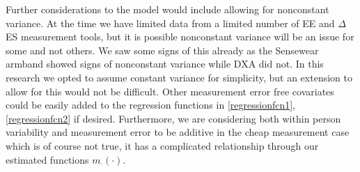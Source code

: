 \documentclass[11pt]{article}\usepackage[]{graphicx}\usepackage[]{color}
\begin{document}
Further considerations to the model would include allowing for nonconstant variance. At the time we have limited data from a limited number of EE and $\Delta$ES measurement tools, but it is possible nonconstant variance will be an issue for some and not others. We saw some signs of this already as the Sensewear armband showed signs of nonconstant variance while DXA did not. In this research we opted to assume constant variance for simplicity, but an extension to allow for this would not be difficult. Other measurement error free covariates could be easily added to the regression functions in \eqref{regressionfcn1},\eqref{regressionfcn2} if desired. 
Furthermore, we are considering both within person variability and measurement error to be additive in the cheap measurement case which is of course not true, it has a complicated relationship through our estimated functions $m_{\cdot}(\cdot)$. %


\clearpage
\end{document}
